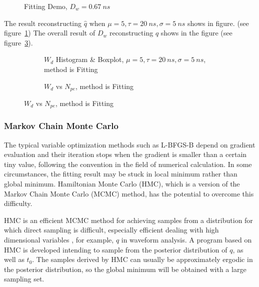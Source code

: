 \begin{figure}[H]
    \centering
    \scalebox{0.4}{}
    \caption{Fitting Demo, $D_w = \SI{0.67}{ns}$}
\end{figure}

The result reconstructing $\hat{q}$ when $\mu=5, \tau=\SI{20}{ns}, \sigma=\SI{5}{ns}$ shows in figure. (see figure~\ref{fig:fitting-hist}) The overall result of $D_w$ reconstructing $\hat{q}$ shows in the figure (see figure~\ref{fig:fitting-npe}). 

\begin{figure}[H]
\begin{minipage}[t]{.5\textwidth}
\begin{figure}[H]
    \centering
    \resizebox{\textwidth}{!}{}
    \caption{\label{fig:fitting-hist} $W_{d}$ Histogram \& Boxplot, $\mu=5, \tau=\SI{20}{ns}, \sigma=\SI{5}{ns}$, method is Fitting}
\end{figure}
\end{minipage}
\begin{minipage}[t]{.5\textwidth}
\begin{figure}[H]
    \centering
    \resizebox{\textwidth}{!}{}
    \caption{\label{fig:fitting-npe} $W_{d}$ vs $N_{pe}$, method is Fitting}
\end{figure}
\end{minipage}
\end{figure}

\subsubsection{Markov Chain Monte Carlo}

The typical variable optimization methods such as L-BFGS-B depend on gradient evaluation and their iteration stops when the gradient is smaller than a certain tiny value, following the convention in the field of numerical calculation. In some circumstances, the fitting result may be stuck in local minimum rather than global minimum. Hamiltonian Monte Carlo (HMC), which is a version of the Markov Chain Monte Carlo (MCMC) method, has the potential to overcome this difficulty. 

HMC is an efficient MCMC method for achieving samples from a distribution for which direct sampling is difficult, especially efficient dealing with high dimensional variables \cite{neal_mcmc_2012}, for example, $q$ in waveform analysis. A program based on HMC is developed intending to sample from the posterior distribution of $q$, as well as $t_{0}$. The samples derived by HMC can usually be approximately ergodic in the posterior distribution, so the global minimum will be obtained with a large sampling set. 

